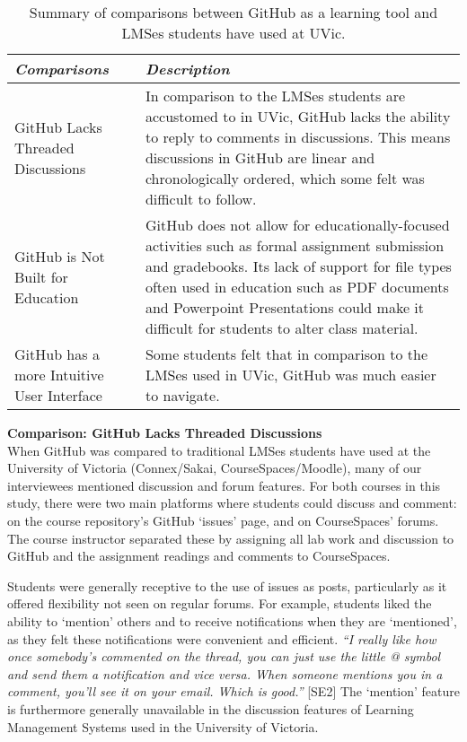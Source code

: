 \begin{table}[h]
    \vspace{1pt}
        \caption{Summary of comparisons between GitHub as a learning tool and LMSes students have used at UVic.}\label{table:interviews:students:comparison}
    \vspace{1pt}
    \begin{center}
        \begin{tabular}{ | m{3cm} | m{12cm} | }
            \hline
            \emph{Comparisons} & \emph{Description} \\
            \hline
            GitHub Lacks Threaded Discussions & In comparison to the LMSes students are accustomed to in UVic, GitHub lacks the ability to reply to comments in discussions. This means discussions in GitHub are linear and chronologically ordered, which some felt was difficult to follow. \\
            \hline
            GitHub is Not Built for Education & GitHub does not allow for educationally-focused activities such as formal assignment submission and gradebooks. Its lack of support for file types often used in education such as PDF documents and Powerpoint Presentations could make it difficult for students to alter class material. \\
            \hline
            GitHub has a more Intuitive User Interface & Some students felt that in comparison to the LMSes used in UVic, GitHub was much easier to navigate. \\
            \hline
        \end{tabular}
    \end{center}
\end{table}

\textbf{Comparison: GitHub Lacks Threaded Discussions} \\
When GitHub was compared to traditional LMSes students have used at the University of Victoria (Connex/Sakai, CourseSpaces/Moodle), many of our interviewees mentioned discussion and forum features. For both courses in this study, there were two main platforms where students could discuss and comment: on the course repository's GitHub `issues' page, and on CourseSpaces' forums. The course instructor separated these by assigning all lab work and discussion to GitHub and the assignment readings and comments to CourseSpaces.

Students were generally receptive to the use of issues as posts, particularly as it offered flexibility not seen on regular forums. For example, students liked the ability to `mention' others and to receive notifications when they are `mentioned', as they felt these notifications were convenient and efficient. \textit{``I really like how once somebody's commented on the thread, you can just use the little @ symbol and send them a notification and vice versa. When someone mentions you in a comment, you'll see it on your email. Which is good.''} [SE2] The `mention' feature is furthermore generally unavailable in the discussion features of Learning Management Systems used in the University of Victoria.

